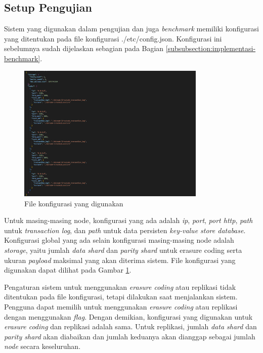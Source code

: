 \subsection{Setup Pengujian}
\label{subsection:setup-pengujian}

Sistem yang digunakan dalam pengujian dan juga \textit{benchmark} memiliki konfigurasi yang ditentukan pada file konfigurasi ./etc/config.json. Konfigurasi ini sebelumnya sudah dijelaskan sebagian pada Bagian \ref{subsubsection:implementasi-benchmark}.

\begin{figure}[ht]
    \centering
    \includegraphics[width=0.80\textwidth]{resources/chapter-4/konfigurasi.png}
    \caption{File konfigurasi yang digunakan}
    \label{fig:config-json}
\end{figure}


Untuk masing-masing node, konfigurasi yang ada adalah \textit{ip}, \textit{port}, \textit{port http}, \textit{path} untuk \textit{transaction log}, dan \textit{path} untuk data persisten \textit{key-value store database}. Konfigurasi global yang ada selain konfigurasi masing-masing node adalah \textit{storage}, yaitu jumlah \textit{data shard} dan \textit{parity shard} untuk erasure coding serta ukuran \textit{payload} maksimal yang akan diterima sistem. File konfigurasi yang digunakan dapat dilihat pada Gambar \ref{fig:config-json}.

Pengaturan sistem untuk menggunakan \textit{erasure coding} atau replikasi tidak ditentukan pada file konfigurasi, tetapi dilakukan saat menjalankan sistem. Pengguna dapat memilih untuk menggunakan \textit{erasure coding} atau
replikasi dengan menggunakan \textit{flag}. Dengan demikian, konfigurasi yang digunakan untuk \textit{erasure coding} dan replikasi adalah sama. Untuk replikasi, jumlah \textit{data shard} dan \textit{parity shard} akan diabaikan dan jumlah keduanya akan dianggap sebagai jumlah \textit{node} secara keseluruhan.

